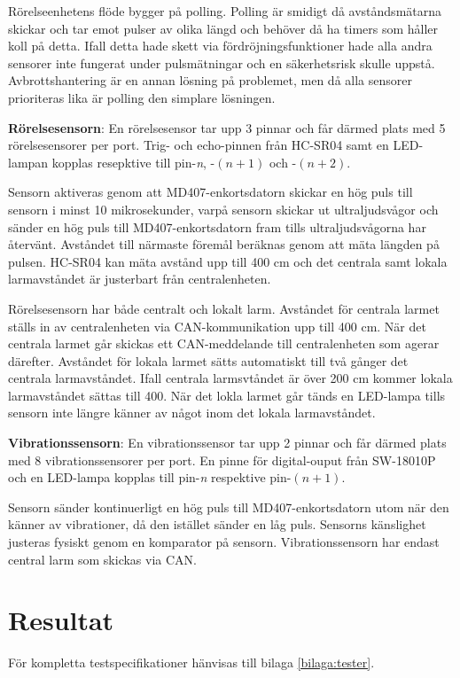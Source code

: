 \documentclass{article}
\begin{document}
Rörelseenhetens flöde bygger på polling. Polling är smidigt då avståndsmätarna skickar och tar emot pulser av olika längd 
och behöver då ha timers som håller koll på detta. Ifall detta hade skett via fördröjningsfunktioner hade alla andra sensorer 
inte fungerat under pulsmätningar och en säkerhetsrisk skulle uppstå. Avbrottshantering är en annan lösning på problemet, 
men då alla sensorer prioriteras lika är polling den simplare lösningen.


\textbf{Rörelsesensorn}:
En rörelsesensor tar upp 3 pinnar och får därmed plats med 5 rörelsesensorer per port.
Trig- och echo-pinnen från HC-SR04 samt en LED-lampan kopplas resepktive till  pin-\textit{n}, -$(n+1)$ och -$(n+2)$.


Sensorn aktiveras genom att MD407-enkortsdatorn skickar en hög puls till sensorn i minst 10 mikrosekunder, 
varpå sensorn skickar ut ultraljudsvågor och sänder en hög puls till MD407-enkortsdatorn fram tills ultraljudsvågorna har återvänt. Avståndet till närmaste föremål beräknas genom att mäta längden på pulsen.
HC-SR04 kan mäta avstånd upp till 400 cm och det centrala samt lokala larmavståndet är justerbart från centralenheten.

Rörelsesensorn har både centralt och lokalt larm. Avståndet för centrala larmet ställs in av centralenheten via CAN-kommunikation 
upp till 400 cm. När det centrala larmet går skickas ett CAN-meddelande till centralenheten som agerar därefter. 
Avståndet för lokala larmet sätts automatiskt till två gånger det centrala larmavståndet. Ifall centrala larmsvtåndet är över 200 cm kommer 
lokala larmavståndet sättas till 400. När det lokla larmet går tänds en LED-lampa tills sensorn inte längre känner av något inom 
det lokala larmavståndet.

\textbf{Vibrationssensorn}:
En vibrationssensor tar upp 2 pinnar och får därmed plats med 8 vibrationssensorer per port. 
En pinne för digital-ouput från SW-18010P och en LED-lampa kopplas till pin-\textit{n} respektive pin-$(n+1)$.

Sensorn sänder kontinuerligt en hög puls till MD407-enkortsdatorn utom när den
känner av vibrationer, då den istället sänder en låg puls. Sensorns känslighet justeras fysiskt genom en komparator på sensorn. 
Vibrationssensorn har endast central larm som skickas via CAN.

\newpage
 \section{Resultat}
 För kompletta testspecifikationer hänvisas till bilaga \ref{bilaga:tester}.
\end{document}
